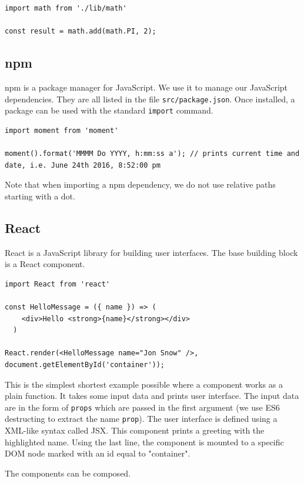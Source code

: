 \begin{verbatim}
import math from './lib/math'

const result = math.add(math.PI, 2);
\end{verbatim}

\subsection{npm}
npm \cite{npm} is a package manager for JavaScript. We use it to manage our JavaScript dependencies. They are all listed in the file \texttt{src/package.json}. Once installed, a package can be used with the standard \texttt{import} command.

\begin{verbatim}
import moment from 'moment'

moment().format('MMMM Do YYYY, h:mm:ss a'); // prints current time and date, i.e. June 24th 2016, 8:52:00 pm
\end{verbatim}

Note that when importing a npm dependency, we do not use relative paths starting with a dot.

\subsection{React}
React \cite{react} is a JavaScript library for building user interfaces. The base building block is a React component.

\begin{verbatim}
import React from 'react'

const HelloMessage = ({ name }) => (
    <div>Hello <strong>{name}</strong></div>
  )

React.render(<HelloMessage name="Jon Snow" />, document.getElementById('container'));
\end{verbatim}


This is the simplest shortest example possible where a component works as a plain function. It takes some input data and prints user interface. The input data are in the form of \texttt{props} which are passed in the first argument (we use ES6 destructing to extract the name \texttt{prop}). The user interface is defined using a XML-like syntax called JSX. This component prints a greeting with the highlighted name. Using the last line, the component is mounted to a specific DOM node marked with an id equal to "container".

The components can be composed. 

